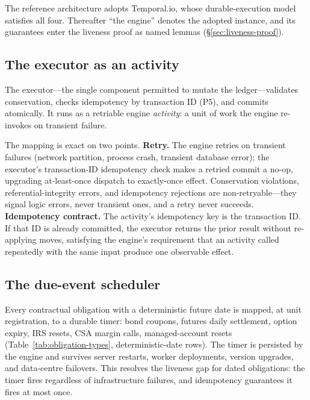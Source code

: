 \noindent The reference architecture adopts Temporal.io, whose durable-execution model satisfies all four. Thereafter ``the engine'' denotes the adopted instance, and its guarantees enter the liveness proof as named lemmas (\S\ref{sec:liveness-proof}).

\subsection{The executor as an activity}
\label{sec:executor-activity}

The executor---the single component permitted to mutate the ledger---validates conservation, checks idempotency by transaction ID (P5), and commits atomically. It runs as a retriable engine \emph{activity}: a unit of work the engine re-invokes on transient failure.

The mapping is exact on two points. \textbf{Retry.} The engine retries on transient failures (network partition, process crash, transient database error); the executor's transaction-ID idempotency check makes a retried commit a no-op, upgrading at-least-once dispatch to exactly-once effect. Conservation violations, referential-integrity errors, and idempotency rejections are non-retryable---they signal logic errors, never transient ones, and a retry never succeeds. \textbf{Idempotency contract.} The activity's idempotency key is the transaction ID. If that ID is already committed, the executor returns the prior result without re-applying moves, satisfying the engine's requirement that an activity called repeatedly with the same input produce one observable effect.

\subsection{The due-event scheduler}
\label{sec:temporal-scheduler}

Every contractual obligation with a deterministic future date is mapped, at unit registration, to a durable timer: bond coupons, futures daily settlement, option expiry, IRS resets, CSA margin calls, managed-account resets (Table~\ref{tab:obligation-types}, deterministic-date rows). The timer is persisted by the engine and survives server restarts, worker deployments, version upgrades, and data-centre failovers. This resolves the liveness gap for dated obligations: the timer fires regardless of infrastructure failures, and idempotency guarantees it fires at most once.

